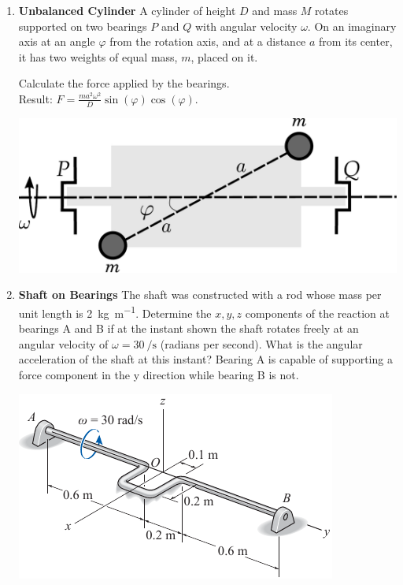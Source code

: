 \documentclass[11pt, english, a4paper, twoside]{article}
\begin{document}
\begin{enumerate}
	\item 
	\begin{minipage}[t][3.5cm]{0.6\textwidth}
	\textbf{Unbalanced Cylinder}
		A cylinder of height \(D\) and mass \(M\) rotates supported on two bearings \(P\) and \(Q\) with angular velocity \(\omega\).
		On an imaginary axis at an angle \(\varphi\) from the rotation axis, and at a distance \(a\) from its center, it has two weights of equal mass, \(m\), placed on it. 
		\begin{tasks} 
			\task Calculate the force applied by the bearings.\\
			Result: \(
				F = \frac{m a^2 \omega^2}{D} \sin(\varphi) \cos(\varphi)
			\).
		\end{tasks}
	\end{minipage}
	\begin{minipage}[c][0.5cm][t]{0.35\textwidth}
		\includegraphics[width=\textwidth]{figures/cilindroDesbalanceado}
	\end{minipage}
		

	\item 
	\begin{minipage}[t][4.5cm]{0.55\textwidth}
		\textbf{Shaft on Bearings}
		The shaft was constructed with a rod whose mass per unit length is \SI{2}{\kilo\gram\per\metre}.
		Determine the \(x, y, z\) components of the reaction at bearings A and B if at the instant shown the shaft rotates freely at an angular velocity of \(\omega = \SI{30}{\per\second}\) (radians per second).
		What is the angular acceleration of the shaft at this instant?
		Bearing A is capable of supporting a force component in the y direction while bearing B is not.
	\end{minipage}
	\begin{minipage}[c][0cm][t]{0.4\textwidth}
		\includegraphics[width=\textwidth]{figures/hibb_21-48}
	\end{minipage}



\end{enumerate}
\end{document}
